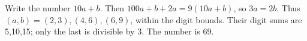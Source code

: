 Write the number $10a+b$. Then $100a+b+2a=9(10a+b)$, so $3a=2b$. Thus $(a,b)=(2,3),(4,6),(6,9)$, within the digit bounds. Their digit sums are 5,10,15; only the last is divisible by 3. The number is $\boxed{69}$.
